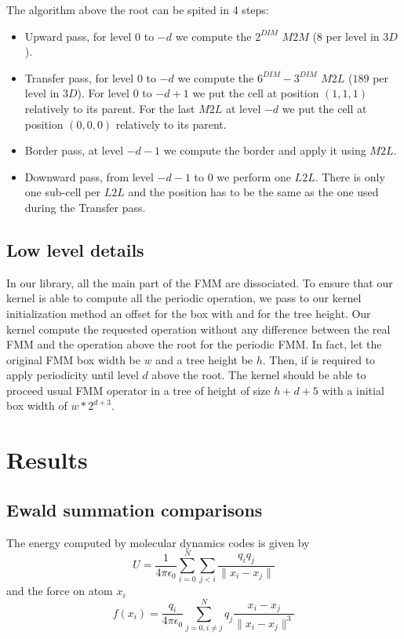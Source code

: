 \documentclass[12pt]{article} %
\begin{document}
The algorithm above the root can be spited in 4 steps:
\begin{itemize}
\item Upward pass, for level $0$ to $-d$ we compute the $2^{DIM}$ $M2M$ ($8$ per level in $3D$).
\item Transfer pass, for level $0$ to $-d$ we compute the $6^{DIM}-3^{DIM}$ $M2L$ ($189$ per level in $3D$).
For level $0$ to $-d+1$ we put the cell at position $(1,1,1)$ relatively to its parent.
For the last $M2L$ at level $-d$ we put the cell at position $(0,0,0)$ relatively to its parent. 
\item Border pass, at level $-d-1$ we compute the border and apply it using $M2L$.
\item Downward pass, from level $-d-1$ to $0$ we perform one $L2L$.
There is only one sub-cell per $L2L$ and the position has to be the same as the one used during the Transfer pass.
\end{itemize}

\subsection{Low level details}

In our library, all the main part of the FMM are dissociated.
To ensure that our kernel is able to compute all the periodic operation, we pass to our kernel initialization method an offset for the box with and
for the tree height.
Our kernel compute the requested operation without any difference between the real FMM and the operation above the root for the periodic FMM.
In fact, let the original FMM box width be $w$ and a tree height be $h$.
Then, if is required to apply periodicity until level $d$ above the root.
The kernel should be able to proceed usual FMM operator in a tree of height of size $h+d+5$ with a initial box width of $w*2^{d+3}$.

\section{Results}
\subsection{Ewald summation comparisons}

The energy computed by molecular dynamics codes is given by
$$
U = \frac{1}{4 \pi\epsilon_0}\sum_{i=0}^{N}{\sum_{j<i}{\frac{q_i q_j}{\|x_i-x_j\|}}}
$$ 
and the force on atom $x_i$
$$
f(x_i) =  \frac{q_i }{4 \pi\epsilon_0}\sum_{j=0,i\neq j}^{N}{q_j\frac{x_i-x_j}{\|x_i-x_j\|^3}}
$$
\end{document}

